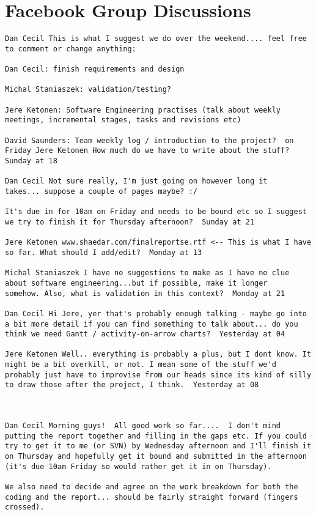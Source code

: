 \section{Facebook Group Discussions}
\begin{verbatim}
Dan Cecil This is what I suggest we do over the weekend.... feel free
to comment or change anything:

Dan Cecil: finish requirements and design

Michal Staniaszek: validation/testing?

Jere Ketonen: Software Engineering practises (talk about weekly
meetings, incremental stages, tasks and revisions etc)

David Saunders: Team weekly log / introduction to the project?  on
Friday Jere Ketonen How much do we have to write about the stuff?
Sunday at 18
 
Dan Cecil Not sure really, I'm just going on however long it
takes... suppose a couple of pages maybe? :/

It's due in for 10am on Friday and needs to be bound etc so I suggest
we try to finish it for Thursday afternoon?  Sunday at 21

Jere Ketonen www.shaedar.com/finalreportse.rtf <-- This is what I have
so far. What should I add/edit?  Monday at 13

Michal Staniaszek I have no suggestions to make as I have no clue
about software engineering...but if possible, make it longer
somehow. Also, what is validation in this context?  Monday at 21

Dan Cecil Hi Jere, yer that's probably enough talking - maybe go into
a bit more detail if you can find something to talk about... do you
think we need Gantt / activity-on-arrow charts?  Yesterday at 04

Jere Ketonen Well.. everything is probably a plus, but I dont know. It
might be a bit overkill, or not. I mean some of the stuff we'd
probably just have to improvise from our heads since its kind of silly
to draw those after the project, I think.  Yesterday at 08



Dan Cecil Morning guys!  All good work so far....  I don't mind
putting the report together and filling in the gaps etc. If you could
try to get it to me (or SVN) by Wednesday afternoon and I'll finish it
on Thursday and hopefully get it bound and submitted in the afternoon
(it's due 10am Friday so would rather get it in on Thursday).

We also need to decide and agree on the work breakdown for both the
coding and the report... should be fairly straight forward (fingers
crossed).


\end{verbatim}
